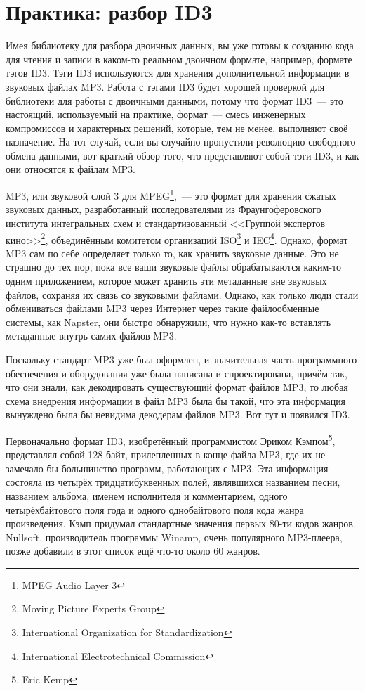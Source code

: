 \chapter{Практика: разбор ID3}
\label{ch:25}

Имея библиотеку для разбора двоичных данных, вы уже готовы к созданию кода для чтения и
записи в каком-то реальном двоичном формате, например, формате тэгов ID3. Тэги ID3
используются для хранения дополнительной информации в звуковых файлах MP3. Работа с тэгами
ID3 будет хорошей проверкой для библиотеки для работы с двоичными данными, потому что
формат ID3~--- это настоящий, используемый на практике, формат~--- смесь инженерных
компромиссов и характерных решений, которые, тем не менее, выполняют своё назначение. На
тот случай, если вы случайно пропустили революцию свободного обмена данными, вот краткий
обзор того, что представляют собой тэги ID3, и как они относятся к файлам MP3.

MP3, или звуковой слой 3 для MPEG\footnote{MPEG Audio Layer 3},~--- это формат для хранения
сжатых звуковых данных, разработанный исследователями из Фраунгоферовского института
интегральных схем и стандартизованный <<Группой экспертов кино>>\footnote{Moving Picture
  Experts Group}, объединённым комитетом организаций ISO\footnote{International
  Organization for Standardization} и IEC\footnote{International Electrotechnical
  Commission}. Однако, формат MP3 сам по себе определяет только то, как хранить звуковые
данные. Это не страшно до тех пор, пока все ваши звуковые файлы обрабатываются каким-то
одним приложением, которое может хранить эти метаданные вне звуковых файлов, сохраняя их
связь со звуковыми файлами. Однако, как только люди стали обмениваться файлами MP3 через
Интернет через такие файлообменные системы, как Napster, они быстро обнаружили, что нужно
как-то вставлять метаданные внутрь самих файлов MP3.

Поскольку стандарт MP3 уже был оформлен, и значительная часть программного обеспечения и
оборудования уже была написана и спроектирована, причём так, что они знали, как
декодировать существующий формат файлов MP3, то любая схема внедрения информации в файл
MP3 была бы такой, что эта информация вынуждено была бы невидима декодерам файлов MP3. Вот
тут и появился ID3.

Первоначально формат ID3, изобретённый программистом Эриком Кэмпом\footnote{Eric Kemp},
представлял собой 128 байт, прилепленных в конце файла MP3, где их не замечало бы
большинство программ, работающих с MP3. Эта информация состояла из четырёх
тридцатибуквенных полей, являвшихся названием песни, названием альбома, именем исполнителя
и комментарием, одного четырёхбайтового поля года и одного однобайтового поля кода жанра
произведения. Кэмп придумал стандартные значения первых 80-ти кодов жанров. Nullsoft,
производитель программы Winamp, очень популярного MP3-плеера, позже добавили в этот список
ещё что-то около 60 жанров.

